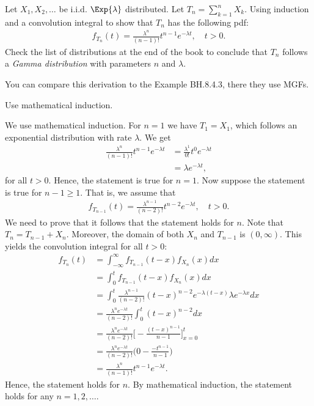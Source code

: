 \begin{exercise}
Let $X_1, X_2, \ldots$ be i.i.d.
$\Exp{\lambda}$ distributed.
Let $T_n = \sum_{k=1}^n X_k$.
Using induction and a convolution integral to show that $T_n$ has the following pdf:
\begin{align}
    f_{T_n}(t) = \frac{\lambda^n}{(n-1)!} t^{n-1} e^{-\lambda t}, \quad t > 0.
\end{align}
Check the list of distributions at the end of the book to conclude that $T_n$ follows a \emph{Gamma distribution} with parameters $n$ and $\lambda$.

You can compare this derivation to the  Example BH.8.4.3, there they use MGFs.

\begin{hint}
Use mathematical induction.
\end{hint}

\begin{solution}
We use mathematical induction. For $n=1$ we have $T_1 = X_1$, which follows an exponential distribution with rate $\lambda$. We get
\begin{align}
    \frac{\lambda^n}{(n-1)!} t^{n-1} e^{-\lambda t} &= \frac{\lambda^1}{0!} t^{0} e^{-\lambda t}\\
    &= \lambda e^{-\lambda t},
\end{align}
for all $t>0$. Hence, the statement is true for $n=1$. Now suppose the statement is true for $n-1 \geq 1$. That is, we assume that
\begin{align}
    f_{T_{n-1}}(t) = \frac{\lambda^{n-1}}{(n-2)!} t^{n-2} e^{-\lambda t}, \quad t > 0.
\end{align}
We need to prove that it follows that the statement holds for $n$. Note that $T_n = T_{n-1} + X_n$. Moreover, the domain of both $X_n$ and $T_{n-1}$ is $(0,\infty)$. This yields the convolution integral for all $t>0$:
\begin{align}
    f_{T_n}(t) &= \int_{-\infty}^{\infty} f_{T_{n-1}}(t - x) f_{X_n}(x) dx \\
    &= \int_0^t f_{T_{n-1}}(t - x) f_{X_n}(x) dx \\
    &= \int_0^t \frac{\lambda^{n-1}}{(n-2)!} (t-x)^{n-2} e^{-\lambda (t-x)} \lambda e^{-\lambda x} dx \\
    &= \frac{\lambda^{n} e^{-\lambda t}}{(n-2)!} \int_0^t (t-x)^{n-2}  dx \\
    &= \frac{\lambda^{n} e^{-\lambda t}}{(n-2)!} \Bigg[ -\frac{(t - x)^{n-1}}{n-1} \Bigg]_{x=0}^t \\
    &= \frac{\lambda^{n} e^{-\lambda t}}{(n-2)!} \Bigg( 0 - \frac{-t^{n-1}}{n-1} \Bigg) \\
    &= \frac{\lambda^{n} }{(n-1)!} t^{n-1} e^{-\lambda t}.
\end{align}
Hence, the statement holds for $n$. By mathematical induction, the statement holds for any $n=1,2,\ldots$.
\end{solution}
\end{exercise}



